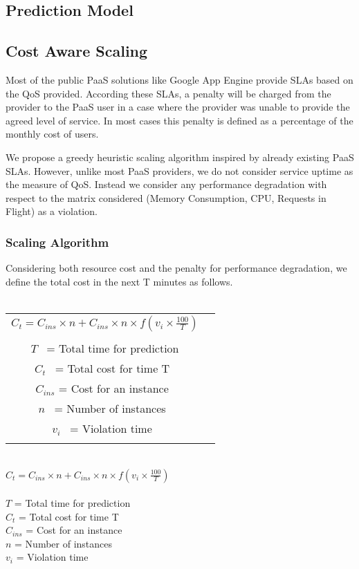 \subsection{Prediction Model}

\subsection{Cost Aware Scaling}
Most of the public PaaS solutions like Google App Engine provide SLAs based on the QoS provided. According these SLAs, a penalty will be charged from the provider to the PaaS user in a case where the provider was unable to provide the agreed level of service. In most cases this penalty is defined as a percentage of the monthly cost of users.

We propose a greedy heuristic scaling algorithm inspired by already existing PaaS SLAs. However, unlike most PaaS providers, we do not consider service uptime as the measure of QoS. Instead we consider any performance degradation with respect to the matrix considered (Memory Consumption, CPU, Requests in Flight) as a violation.

\subsubsection{Scaling Algorithm}
Considering both resource cost and the penalty for performance degradation, we define the total cost in the next T minutes as follows.\\
\\
\begin{table} 
    \begin{tabular}{ c c }
        \textbf{$ C_t = C_{ins} \times n  +  C_{ins} \times n \times f(v_i \times \frac{100}{T}) $} \\\\$ T $  = Total time for prediction \\$ C_t $  = Total cost for time T  \\$ C_{ins} $ = Cost for an instance \\$ n $  = Number of instances  \\$ v_i $  = Violation time  \\ &  \\ 
    \end{tabular} 
\end{table}
\\
\textbf{$ C_t = C_{ins} \times n  +  C_{ins} \times n \times f(v_i \times \frac{100}{T}) $} \\
\\
$T$       = Total time for prediction \\
$C_t $    = Total cost for time T  \\
$C_{ins}$ = Cost for an instance   \\
$n$       = Number of instances  \\
$v_i$     = Violation time  \\

